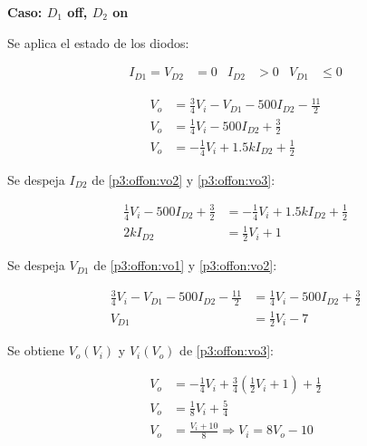 %
%
%

\bigskip

\textbf{Caso: $D_1$ off, $D_2$ on}

Se aplica el estado de los diodos:

\begin{align*}
  I_{D1} = V_{D2} &= 0
  &
  I_{D2} &> 0
  &
  V_{D1} &\leq 0
\end{align*}

\begin{align}
  V_o &=
    \frac{3}{4} V_i
    - V_{D1}
    - 500 I_{D2}
    - \frac{11}{2} \label{p3:offon:vo1}
  \\
  V_o &=
    \frac{1}{4} V_i
    - 500 I_{D2}
    + \frac{3}{2} \label{p3:offon:vo2}
  \\
  V_o &=
    - \frac{1}{4} V_i
    + 1.5k I_{D2}
    + \frac{1}{2} \label{p3:offon:vo3}
\end{align}

Se despeja $I_{D2}$ de \ref{p3:offon:vo2} y \ref{p3:offon:vo3}:

\begin{align*}
  \frac{1}{4} V_i   - 500 I_{D2}  + \frac{3}{2} &=
  - \frac{1}{4} V_i + 1.5k I_{D2} + \frac{1}{2}
  \\
  2k I_{D2} &= \frac{1}{2} V_i + 1
\end{align*}

Se despeja $V_{D1}$ de \ref{p3:offon:vo1} y \ref{p3:offon:vo2}:

\begin{align*}
  \frac{3}{4} V_i - V_{D1} - 500 I_{D2} - \frac{11}{2} &=
  \frac{1}{4} V_i          - 500 I_{D2} + \frac{3}{2}
  \\
  V_{D1} &= \frac{1}{2} V_i - 7
\end{align*}


Se obtiene $V_o(V_i)$ y $V_i(V_o)$ de \ref{p3:offon:vo3}:

\begin{align*}
  V_o &= - \frac{1}{4} V_i + \frac{3}{4} \left( \frac{1}{2} V_i + 1 \right) + \frac{1}{2}
  \\
  V_o &= \frac{1}{8} V_i + \frac{5}{4}
  \\
  V_o &= \frac{V_i + 10}{8} \Rightarrow V_i = 8 V_o - 10
\end{align*}

